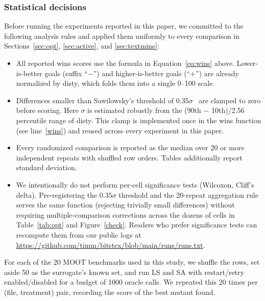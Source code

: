 \documentclass[AMA,STIX2COL]{WileyNJDv5}
\begin{document}
\subsubsection{Statistical decisions}
Before running the experiments reported in this paper, we
committed to the following analysis rules and applied them
uniformly to every comparison in Sections~\ref{sec:opt},
\ref{sec:active}, and \ref{sec:textmine}:
\begin{itemize}
\item All reported \textsf{wins} scores use the formula in
Equation~\ref{eq:wins} above. Lower-is-better goals
(suffix ``$-$'') and higher-is-better goals (``$+$'') are
already normalized by \textsf{disty}, which folds them into
a single 0--100 scale.
\item Differences smaller than Sawilowsky's threshold of
$0.35\sigma$~\cite{sawilowsky2009new} are clamped to zero
before scoring. Here $\sigma$ is estimated robustly from the
(90th $-$ 10th)/2.56 percentile range of \textsf{disty}.
This clamp is implemented once in the \textsf{wins}
function (see line~\ref{wins}) and reused across every
experiment in this paper.
\item Every randomized comparison is reported as the median
over 20 or more independent repeats with shuffled row
orders. Tables additionally report standard deviation.
\item We intentionally do not perform per-cell significance
tests (Wilcoxon, Cliff's delta). Pre-registering the
$0.35\sigma$ threshold and the 20-repeat aggregation rule
serves the same function (rejecting trivially small
differences) without requiring multiple-comparison
corrections across the dozens of cells in
Table~\ref{tab:opt} and Figure~\ref{check}. Readers who
prefer significance tests can recompute them from our
public logs at
\url{https://github.com/timm/bitstex/blob/main/runs/runs.txt}.
\end{itemize}


For each of the 20 MOOT benchmarks used in this study, we shuffle the
rows, set aside 50 as the surrogate's known set, and run 
LS and SA with restart/retry enabled/disabled
for a budget of 1000 oracle calls. We repeated
this 20 times per (file, treatment) pair, recording the score of
the best mutant found.
\end{document}
